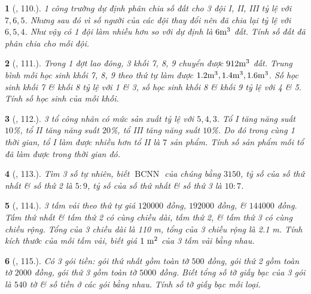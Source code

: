 \documentclass{article}
\newtheorem{baitoan}{}
\begin{document}
\begin{baitoan}[\cite{Binh_Toan_7_tap_1}, 110.]
	1 công trường dự định phân chia số đất cho 3 đội I, II, III tỷ lệ với $7,6,5$. Nhưng sau đó vì số người của các đội thay đổi nên đã chia lại tỷ lệ với $6,5,4$. Như vậy có 1 đội làm nhiều hơn so với dự định là $\rm6m^3$ đất. Tính số đất đã phân chia cho mỗi đội.
\end{baitoan}

\begin{baitoan}[\cite{Binh_Toan_7_tap_1}, 111.]
	Trong 1 đợt lao đông, 3 khối 7, 8, 9 chuyển được $\rm912m^3$ đất. Trung bình mỗi học sinh khối 7, 8, 9 theo thứ tự làm được $\rm1.2m^3,1.4m^3,1.6m^3$. Số học sinh khối 7 \& khối 8 tỷ lệ với 1 \& 3, số học sinh khối 8 \& khối 9 tỷ lệ với 4 \& 5. Tính số học sinh của mỗi khối.
\end{baitoan}

\begin{baitoan}[\cite{Binh_Toan_7_tap_1}, 112.]
	3 tổ công nhân có mức sản xuất tỷ lệ với $5,4,3$. Tổ I tăng năng suất $10$\%, tổ II tăng năng suất $20$\%, tổ III tăng năng suất $10$\%. Do đó trong cùng 1 thời gian, tổ I làm được nhiều hơn tổ II là $7$ sản phẩm. Tính số sản phẩm mỗi tổ đã làm được trong thời gian đó.
\end{baitoan}

\begin{baitoan}[\cite{Binh_Toan_7_tap_1}, 113.]
	Tìm 3 số tự nhiên, biết $\operatorname{BCNN}$ của chúng bằng $3150$, tỷ số của số thứ nhất \& số thứ 2 là $5:9$, tỷ số của số thứ nhất \& số thứ 3 là $10:7$.
\end{baitoan}

\begin{baitoan}[\cite{Binh_Toan_7_tap_1}, 114.]
	3 tấm vải theo thứ tự giá $120000$ đồng, $192000$ đồng, \& $144000$ đồng. Tấm thứ nhất \& tấm thứ 2 có cùng chiều dài, tấm thứ 2, \& tấm thứ 3 có cùng chiều rộng. Tổng của 3 chiều dài là {\rm110 m}, tổng của 3 chiều rộng là {\rm2.1 m}. Tính kích thước của mỗi tấm vải, biết giá $\rm1\ m^2$ của 3 tấm vải bằng nhau.
\end{baitoan}

\begin{baitoan}[\cite{Binh_Toan_7_tap_1}, 115.]
	Có 3 gói tiền: gói thứ nhất gồm toàn tờ $500$ đồng, gói thứ 2 gồm toàn tờ $2000$ đồng, gói thứ 3 gồm toàn tờ $5000$ đồng. Biết tổng số tờ giấy bạc của 3 gói là $540$ tờ \& số tiền ở các gói bằng nhau. Tính số tờ giấy bạc mỗi loại.
\end{baitoan}
\end{document}
